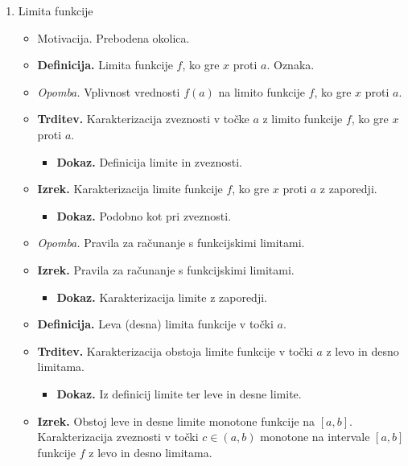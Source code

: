 \begin{enumerate}
    \item Limita funkcije 
    \begin{itemize}
        \item Motivacija. Prebodena okolica.
        \item \colorbox{purple!30}{\textbf{Definicija.}} Limita funkcije $f$, ko gre $x$ proti $a$. Oznaka.
        \item \colorbox{yellow!30}{\emph{Opomba.}} Vplivnost vrednosti $f(a)$ na limito funkcije $f$, ko gre $x$ proti $a$.
        \item \colorbox{blue!30}{\textbf{Trditev.}} Karakterizacija zveznosti v točke $a$ z limito funkcije $f$, ko gre $x$ proti $a$.
        \begin{itemize}
            \item \colorbox{green!30}{\textbf{Dokaz.}} Definicija limite in zveznosti.
        \end{itemize}
        \item \colorbox{blue!30}{\textbf{Izrek.}} Karakterizacija limite funkcije $f$, ko gre $x$ proti $a$ z zaporedji.
        \begin{itemize}
            \item \colorbox{green!30}{\textbf{Dokaz.}} Podobno kot pri zveznosti.
        \end{itemize}
        \item \colorbox{yellow!30}{\emph{Opomba.}} Pravila za računanje s funkcijskimi limitami.
        \item \colorbox{blue!30}{\textbf{Izrek.}} Pravila za računanje s funkcijskimi limitami.
        \begin{itemize}
            \item \colorbox{green!30}{\textbf{Dokaz.}} Karakterizacija limite z zaporedji.
        \end{itemize}
        \item \colorbox{purple!30}{\textbf{Definicija.}} Leva (desna) limita funkcije v točki $a$.
        \item \colorbox{blue!30}{\textbf{Trditev.}} Karakterizacija obstoja limite funkcije v točki $a$ z levo in desno limitama.
        \begin{itemize}
            \item \colorbox{green!30}{\textbf{Dokaz.}} Iz definicij limite ter leve in desne limite.
        \end{itemize}
        \item \colorbox{blue!30}{\textbf{Izrek.}} Obstoj leve in desne limite monotone funkcije na $[a,b]$. Karakterizacija zveznosti v točki $c \in (a,b)$ monotone na intervale $[a,b]$ funkcije $f$ z levo in desno limitama.

\end{itemize}
\end{enumerate}
